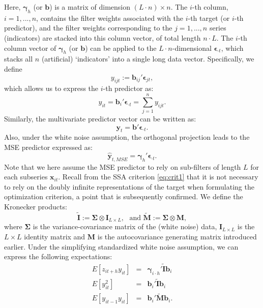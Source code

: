 \documentclass[11pt,a4paper]{article}
\begin{document}
Here, $\boldsymbol{\gamma}_{h}$ (or $\mathbf{b}$) is a matrix of dimension $(L\cdot n)\times n$. The $i$-th column, $i=1,...,n$, contains the filter weights associated with the $i$-th target (or $i$-th predictor), and the filter weights corresponding to the $j=1,...,n$ series (indicators) are stacked into this column vector, of total length $n\cdot L$. The $i$-th column vector of $\boldsymbol{\gamma}_{h}$ (or $\mathbf{b}$) can be applied to the $L\cdot n$-dimensional $\boldsymbol{\epsilon}_{\cdot t}$, which stacks all $n$ (artificial) `indicators' into a single long data vector. Specifically, we define 
\[
y_{ijt} := \mathbf{b}_{ij}'\boldsymbol{\epsilon}_{jt},
\]
which allows us to express the $i$-th predictor as:
\[
y_{it} = \mathbf{b}_i'\boldsymbol{\epsilon}_{\cdot t} = \sum_{j=1}^n y_{ijt}.
\] 
Similarly, the multivariate predictor vector can be written as:
\[
\mathbf{y}_t = \mathbf{b}'\boldsymbol{\epsilon}_{\cdot t}.
\]
Also, under the white noise assumption, the orthogonal projection leads to the MSE predictor expressed as:
\[
\hat{\mathbf{y}}_{t,MSE} = \boldsymbol{\gamma}_{h}'\boldsymbol{\epsilon}_{\cdot t}.
\]
Note that we here assume the MSE predictor to rely on sub-filters of length $L$ for each subseries $\mathbf{x}_{it}$. 
Recall from the SSA criterion \eqref{eq:crit1} that it is not necessary to rely on the doubly infinite representations of the target when formulating the optimization criterion, a point that is subsequently confirmed. 
We define the Kronecker products: 
\[
\tilde{\mathbf{I}}:=\boldsymbol{\Sigma}\otimes\mathbf{I}_{L\times L},\textrm{ ~and~} \tilde{\mathbf{M}}:=\boldsymbol{\Sigma}\otimes\mathbf{M},
\]
where $\boldsymbol{\Sigma}$ is the variance-covariance matrix of the (white noise) data, $\mathbf{I}_{L\times L}$ is the $L\times L$ identity matrix and $\mathbf{M}$ is the autocovariance generating matrix introduced earlier. Under the simplifying standardized white noise assumption, we can express the following expectations: 
\begin{eqnarray}
E[z_{it+h}y_{it}]&=&\boldsymbol{\gamma}_{i\cdot h}'\tilde{\mathbf{I}}\mathbf{b}_{i}\nonumber\\%
E[y_{it}^2]&=&\mathbf{b}_{i}'\tilde{\mathbf{I}}\mathbf{b}_{i}\nonumber\\%
E[y_{it-1}y_{it}]&=&\mathbf{b}_{i}'\tilde{\mathbf{M}}\mathbf{b}_{i}.\nonumber
\end{eqnarray}
\end{document}
